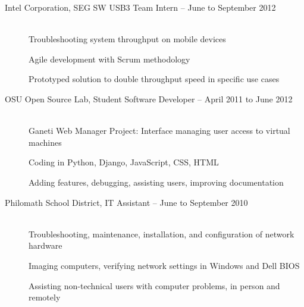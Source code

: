 \documentclass[11pt]{article}
\begin{document}
\begin{description}

\item[Intel Corporation, SEG SW USB3 Team Intern -- June to September
2012]
    \hfill \\
    Troubleshooting system throughput on mobile devices

    Agile development with Scrum methodology

    Prototyped solution to double throughput speed in specific use cases

\item[OSU Open Source Lab, Student Software Developer -- April 2011 to June
2012]
    \hfill \\
    Ganeti Web Manager Project: Interface managing user access to
    virtual machines

    Coding in Python, Django, JavaScript, CSS, HTML

    Adding features, debugging, assisting users, improving documentation

\item[Philomath School District, IT Assistant -- June to September 2010]
    \hfill \\
    Troubleshooting, maintenance, installation, and configuration of
    network hardware

    Imaging computers, verifying network settings in Windows and Dell
    BIOS

    Assisting non-technical users with computer problems, in person and
    remotely

\end{description}
\end{document}
